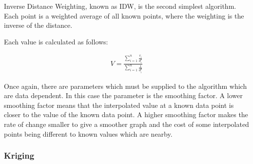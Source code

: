             Inverse Distance Weighting, known as IDW, is the second simplest algorithm. Each point is a weighted average of all known points, where the weighting is the inverse of the distance. 

            Each value is calculated as follows:

            \begin{align*}
                V = \frac{\sum_{i=1}^{n}{\frac{v_{i}}{d^{p}_{i}}}}{\sum_{i=1}^{n}{\frac{1}{d^{p}_{i}}}}
            \end{align*}

            Once again, there are parameters which must be supplied to the algorithm which are data dependent. In this case the parameter is the smoothing factor. A lower smoothing factor means that the interpolated value at a known data point is closer to the value of the known data point. A higher smoothing factor makes the rate of change smaller to give a smoother graph and the cost of some interpolated points being different to known values which are nearby.

        \subsubsection{Kriging}\label{background_interpolation_methods_kriging}
